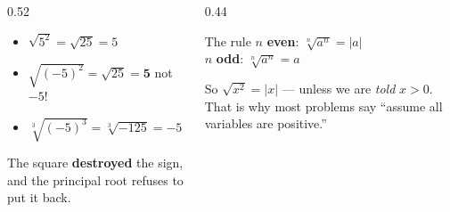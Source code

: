 \documentclass[aspectratio=169, 11pt]{beamer}
\begin{document}
\begin{frame}[t, plain]
  \begin{columns}[T]
    \begin{column}{0.52\textwidth}
      \begin{itemize}\setlength{\itemsep}{6pt}
        \item $\sqrt{5^{2}} = \sqrt{25} = 5$ 
        \item $\sqrt{(-5)^{2}} = \sqrt{25} = \textbf{5}$ \quad
              {\footnotesize \textcolor{keyred}{not $-5$!}}
        \item $\sqrt[3]{(-5)^{3}} = \sqrt[3]{-125} = -5$ 
      \end{itemize}
      \vspace{4pt}
      {\footnotesize The square \textbf{destroyed} the sign, and the principal root refuses to put it
      back.}
    \end{column}
    \begin{column}{0.44\textwidth}
      \begin{block}{The rule}
        \centering
        $n$ \textbf{even}: \; $\sqrt[n]{a^{n}} = |a|$ \\[5pt]
        $n$ \textbf{odd}: \; $\sqrt[n]{a^{n}} = a$
      \end{block}
      \vspace{3pt}
      {\footnotesize So $\sqrt{x^{2}}=|x|$ --- unless we are \emph{told} $x>0$.
      That is why most problems say ``assume all variables are positive.''}
    \end{column}
  \end{columns}
\end{frame}
\end{document}

